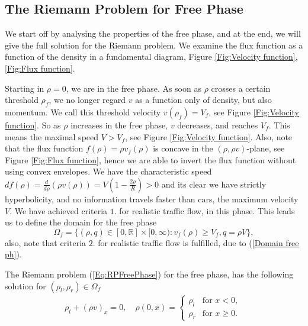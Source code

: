 \documentclass[10pt]{article}
\numberwithin{equation}{section}
\begin{document}
\subsection{The Riemann Problem for Free Phase}\label{RPFreePh}
We start off by analysing the properties of the free phase, and at the end, we will give the full solution for the Riemann problem. We examine the flux function as a function of the density in a fundamental diagram, Figure \ref{Fig:Velocity function}, \ref{Fig:Flux function}. 
\begin{figure} \centering 
   
\end{figure}
Starting in $\rho = 0$, we are in the free phase. As soon as $\rho$ crosses a certain threshold $\rho_f$, we no longer regard $v$ as a function only of density, but also momentum. We call this threshold velocity $v(\rho_f) = V_f$, see Figure \ref{Fig:Velocity function}. So as $\rho$ increases in the free phase,  $v$ decreases, and reaches $V_f$. This means the maximal speed $V > V_f $, see Figure \ref{Fig:Velocity function}. Also, note that the flux function $f(\rho) = \rho v_f(\rho) $ is concave in the $(\rho , \rho v)$-plane, see Figure \ref{Fig:Flux function}, hence we are able to invert the flux function without using convex envelopes. We have the characteristic speed $df(\rho) = \frac{d}{d\rho}(\rho v(\rho)) = V(1- \frac{2\rho}{R}) > 0$ and its clear we have strictly hyperbolicity, and no information travels faster than cars, the maximum velocity $V$. We have achieved criteria $1.$ for realistic traffic flow, in this phase. This leads us to define the domain for the free phase \begin{equation}
    \Omega_f = \{(\rho, q) \in [0, \mathbb{R}] \times [0, \infty) : v_f(\rho) \geq V_f, q= \rho V \},
    \label{Domain free ph}
\end{equation} also, note that criteria $2.$ for realistic traffic flow is fulfilled, due to (\ref{Domain free ph}). 

The Riemann problem (\ref{Eq:RPFreePhase}) for the free phase, has the following solution for $(\rho_l, \rho_r) \in \Omega_f$
\begin{align}
    \rho_t + (\rho v)_x = 0,\quad  \rho(0,x) = \begin{cases} 
    \rho_l  & \text{for $x < 0$, }\\
    \rho_r  & \text{for $x \geq 0$.} 
    \end{cases}
    \label{Eq:RPFreePhase}
\end{align}
\end{document}
